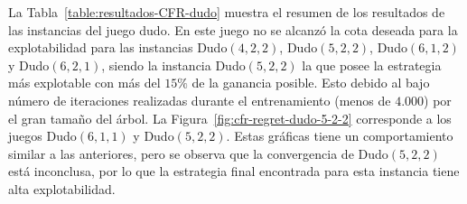 La Tabla~\ref{table:resultados-CFR-dudo} muestra el resumen de los resultados de las instancias del juego dudo. En este juego no se alcanzó la cota deseada para la explotabilidad para las instancias Dudo$(4, 2, 2)$, Dudo$(5, 2, 2)$, Dudo$(6, 1, 2)$ y Dudo$(6, 2, 1)$, siendo la instancia Dudo$(5, 2, 2)$ la que posee la estrategia más explotable con más del $15\%$ de la ganancia posible. Esto debido al bajo número de iteraciones realizadas durante el entrenamiento (menos de $4.000$) por el gran tamaño del árbol. La Figura~\ref{fig:cfr-regret-dudo-5-2-2} corresponde a los juegos Dudo$(6, 1, 1)$ y Dudo$(5, 2, 2)$. Estas gráficas tiene un comportamiento similar a las anteriores, pero se observa que la convergencia de Dudo$(5, 2, 2)$ está inconclusa, por lo que la estrategia final encontrada para esta instancia tiene alta explotabilidad.

